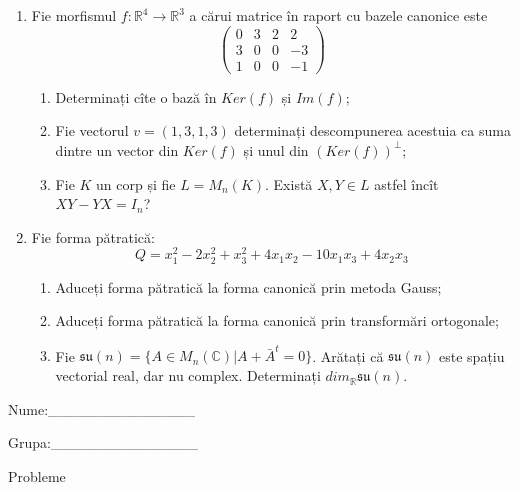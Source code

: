 \documentclass{article}
\begin{document}
\begin{enumerate}
 \item Fie morfismul $f:\mathbb{R}^4 \to \mathbb{R}^3$ a cărui matrice în raport cu bazele canonice este
$$\begin{pmatrix}
0&3&2&2\\
3&0&0&-3\\
1&0&0&-1
\end{pmatrix}$$

\begin{enumerate}
\item Determinați cîte o bază în $Ker(f)$ și $Im(f)$;
\item Fie vectorul $v=(1,3,1,3)$ determinați descompunerea acestuia ca suma dintre un vector din $Ker(f)$ și unul din $(Ker(f))^\perp$;
\item Fie $K$ un corp și fie $L=M_n(K)$. Există $X,Y \in L$ astfel încît $XY-YX=I_n$?  
\end{enumerate}
\item Fie forma pătratică:
$$Q= x_1^2-2x_2^2+x_3^2+4x_1x_2-10x_1x_3+4x_2x_3$$

\begin{enumerate}
\item Aduceți forma pătratică la forma canonică prin metoda Gauss;
\item Aduceți forma pătratică la forma canonică prin transformări ortogonale;
\item Fie $\mathfrak{su}(n)=\{ A \in M_n(\mathbb{C}) | A+\bar{A}^t=0\}$. Arătați că $\mathfrak{su}(n)$ este spațiu vectorial real, dar nu complex.
Determinați $dim_{\mathbb{R}}\mathfrak{su}(n)$.
\end{enumerate}
\end{enumerate}
\newpage
\begin{flushright}
Nume:\_\_\_\_\_\_\_\_\_\_\_\_\_\_
 
 
Grupa:\_\_\_\_\_\_\_\_\_\_\_\_\_\_
\end{flushright}
\begin{center}
\vspace{2cm}
{\Large Probleme}
\vspace{2cm}
\end{center}
\end{document}
